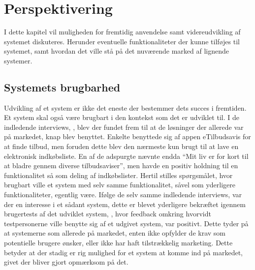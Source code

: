 \chapter{Perspektivering}
I dette kapitel vil muligheden for fremtidig anvendelse samt videreudvikling af systemet diskuteres.
Herunder eventuelle funktionaliteter der kunne tilføjes til systemet, samt hvordan det ville stå på det nuværende marked af lignende systemer.

\section{Systemets brugbarhed}
Udvikling af et system er ikke det eneste der bestemmer dets succes i fremtiden.
Et system skal også være brugbart i den kontekst som det er udviklet til.
I de indledende interviews, , blev der fundet frem til at de løsninger der allerede var på markedet, knap blev benyttet.
Enkelte benyttede sig af appen eTilbudsavis for at finde tilbud, men foruden dette blev den nærmeste kun brugt til at lave en elektronisk indkøbsliste.
En af de adspurgte nævnte endda ``Mit liv er for kort til at bladre gennem diverse tilbudsaviser'', men havde en positiv holdning til en funktionalitet så som deling af indkøbslister.
Hertil stilles spørgsmålet, hvor brugbart ville et system med selv samme funktionalitet, såvel som yderligere funktionaliteter, egentlig være.
Ifølge de selv samme indledende interviews, var der en interesse i et sådant system, dette er blevet yderligere bekræftet igennem brugertests af det udviklet system, , hvor feedback omkring hvorvidt testpersonerne ville benytte sig af et udgivet system, var positivt.
Dette tyder på at systemerne som allerede på markedet, enten ikke opfylder de krav som potentielle brugere ønsker, eller ikke har haft tilstrækkelig marketing. 
Dette betyder at der stadig er rig mulighed for et system at komme ind på markedet, givet der bliver gjort opmærksom på det.

